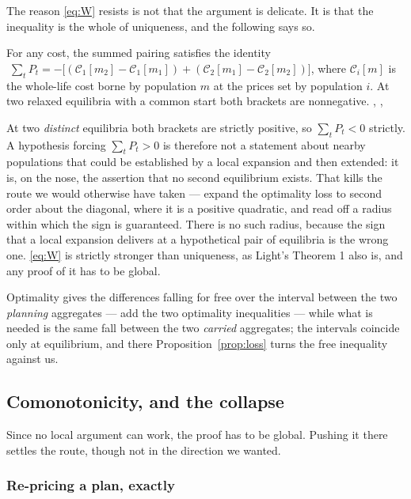 The reason \eqref{eq:W} resists is not that the argument is delicate. It is that the inequality is
the whole of uniqueness, and the following says so.

\begin{proposition}\label{prop:loss}
For any cost, the summed pairing satisfies the identity
$\;\sum_tP_t=-\bigl[(\mathcal C_1[m_2]-\mathcal C_1[m_1])+(\mathcal C_2[m_1]-\mathcal C_2[m_2])\bigr]$,
where $\mathcal C_i[m]$ is the whole-life cost borne by population $m$ at the prices set by
population $i$. At two relaxed equilibria with a common start both brackets are nonnegative.
,
,
\end{proposition}

At two \emph{distinct} equilibria both brackets are strictly positive, so $\sum_tP_t<0$ strictly.
A hypothesis forcing $\sum_tP_t>0$ is therefore not a statement about nearby populations that could
be established by a local expansion and then extended: it is, on the nose, the assertion that no
second equilibrium exists. That kills the route we would otherwise have taken --- expand the
optimality loss to second order about the diagonal, where it is a positive quadratic, and read off
a radius within which the sign is guaranteed. There is no such radius, because the sign that a local
expansion delivers at a hypothetical pair of equilibria is the wrong one. \eqref{eq:W} is strictly
stronger than uniqueness, as Light's Theorem 1 also is, and any proof of it has to be global.

Optimality gives the differences falling for free over the interval between the two \emph{planning}
aggregates --- add the two optimality inequalities --- while what is needed is the same fall between
the two \emph{carried} aggregates; the intervals coincide only at equilibrium, and there
Proposition~\ref{prop:loss} turns the free inequality against us.

\subsection{Comonotonicity, and the collapse}

Since no local argument can work, the proof has to be global. Pushing it there settles the route,
though not in the direction we wanted.

\subsubsection*{Re-pricing a plan, exactly}

